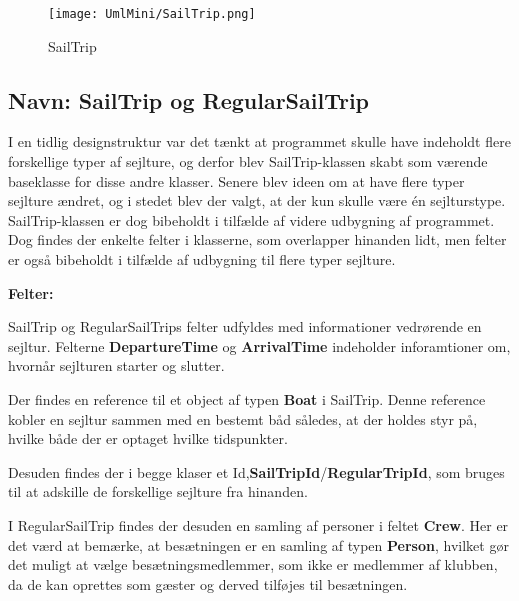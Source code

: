  
\begin{wrapfigure}[12]{R}{0.4\textwidth}
    \label{img:SailTrip}
    \vspace{-20pt}
    \begin{center}
        \texttt{[image: UmlMini/SailTrip.png]}
    \end{center}
    \vspace{-20pt}
    \caption{SailTrip}
\end{wrapfigure}

\subsection*{Navn: SailTrip og RegularSailTrip}

I en tidlig designstruktur var det tænkt at programmet skulle have indeholdt flere forskellige typer af sejlture, og derfor blev SailTrip-klassen skabt som værende baseklasse for disse andre klasser. 
Senere blev ideen om at have flere typer sejlture ændret, og i stedet blev der valgt, at der kun skulle være én sejlturstype. 
SailTrip-klassen er dog bibeholdt i tilfælde af videre udbygning af programmet.
Dog findes der enkelte felter i klasserne, som overlapper hinanden lidt, men felter er også bibeholdt i tilfælde af udbygning til flere typer sejlture.

\textbf{Felter:}

SailTrip og RegularSailTrips felter udfyldes med informationer vedrørende en sejltur.
Felterne \textbf{DepartureTime} og \textbf{ArrivalTime} indeholder inforamtioner om, hvornår sejlturen starter og slutter.

Der findes en reference til et object af typen \textbf{Boat} i SailTrip.
Denne reference kobler en sejltur sammen med en bestemt båd således, at der holdes styr på, hvilke både der er optaget hvilke tidspunkter.

Desuden findes der i begge klaser et Id,\textbf{SailTripId}/\textbf{RegularTripId}, som bruges til at adskille de forskellige sejlture fra hinanden.

I RegularSailTrip findes der desuden en samling af personer i feltet \textbf{Crew}.
Her er det værd at bemærke, at besætningen er en samling af typen \textbf{Person}, hvilket gør det muligt at vælge besætningsmedlemmer, som ikke er medlemmer af klubben, da de kan oprettes som gæster og derved tilføjes til besætningen.

